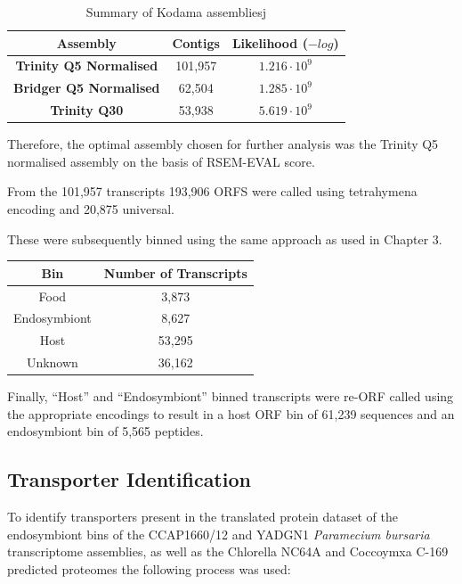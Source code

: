 \begin{table}
    \begin{tabular}{|c|c|c|}
        \hline
        \textbf{Assembly} & \textbf{Contigs} & \textbf{Likelihood (\(-log\))}\\
        \hline
        \textbf{Trinity Q5 Normalised}  & 101,957 & \(1.216\cdot10^9\)\\
        \textbf{Bridger Q5 Normalised} & 62,504 & \(1.285\cdot10^9\)\\
        \textbf{Trinity Q30} & 53,938  & \(5.619\cdot10^{9} \) \\
        \hline
    \end{tabular}
    \caption{Summary of Kodama assembliesj}
    \label{tab:kodama_assembly}
\end{table}

Therefore, the optimal assembly chosen for further analysis was the Trinity
Q5 normalised assembly on the basis of RSEM-EVAL score. 

From the 101,957 transcripts 193,906 ORFS were called using tetrahymena 
encoding and 20,875 universal.

These were subsequently binned using the same approach as used in 
Chapter 3. 

\begin{table}
    \begin{tabular}{|c|c|}
        \hline
        \textbf{Bin} & \textbf{Number of Transcripts} \\
        \hline
        Food & 3,873 \\
        Endosymbiont & 8,627 \\
        Host & 53,295 \\
        Unknown & 36,162 \\
        \hline
    \end{tabular}
\end{table}

Finally, ``Host'' and ``Endosymbiont'' binned transcripts 
were re-ORF called using the appropriate encodings to result in a 
host ORF bin of 61,239 sequences
and an endosymbiont bin of 5,565 peptides. 

\subsection{Transporter Identification}

To identify transporters present in the translated protein dataset of the 
endosymbiont bins of the CCAP1660/12 and YADGN1 
\textit{Paramecium bursaria} transcriptome assemblies, as well as the Chlorella NC64A 
and Coccoymxa C-169 predicted proteomes the following process was used:

